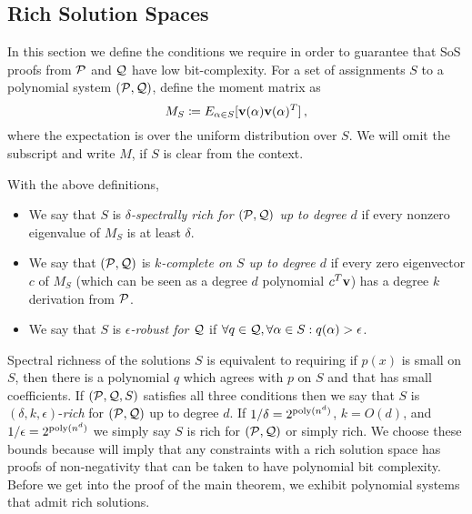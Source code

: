 \subsection{Rich Solution Spaces}
In this section we define the conditions we require in order to guarantee that SoS proofs from $\mathcal P$ and $\mathcal Q$ have low bit-complexity.
For a set of assignments $S$ to a polynomial system $(\mathcal P,\mathcal Q)$, define the moment matrix as
\[M_S \coloneqq E_{\alpha \in S}[{\bf v}(\alpha){\bf v}(\alpha)^T]\,,\]
where the expectation is over the uniform distribution over $S$.  We will omit the subscript and write $M$, if $S$ is clear from the context.

\begin{definition}\label{def:nice}
With the above definitions, 
\begin{itemize}
\item We say that $S$ is \emph{$\delta$-spectrally rich for $(\mathcal P, \mathcal Q)$ up to degree $d$} if every nonzero eigenvalue of $M_S$ is at least $\delta$.
\item We say that $(\mathcal P, \mathcal Q)$ is \emph{$k$-complete on $S$ up to degree $d$} if every zero eigenvector $c$ of $M_S$ (which can be seen as a degree $d$ polynomial $c^T{\bf v}$) has a degree $k$ derivation from $\mathcal P$. 
\item We say that $S$ is \emph{$\epsilon$-robust for $\mathcal Q$} if $\forall q \in \mathcal Q, \forall \alpha \in S: q(\alpha) > \epsilon$.
\end{itemize}
\end{definition}
Spectral richness of the solutions $S$ is equivalent to requiring if $p(x)$ is small on $S$, then there is a polynomial $q$ which agrees with $p$ on $S$ and that has small coefficients. If $(\mathcal P, \mathcal Q, S)$ satisfies all three conditions then we say that $S$ is $(\delta, k, \epsilon)$-\emph{rich} for $(\mathcal P, \mathcal Q)$ up to degree $d$. If $1/\delta = 2^{\operatorname{poly}(n^d)}$, $k = O(d)$, and $1/\epsilon = 2^{\operatorname{poly}(n^d)}$ we simply say $S$ is rich for $(\mathcal P, \mathcal Q)$ or simply rich. We choose these bounds because  will imply that any constraints with a rich solution space has proofs of non-negativity that can be taken to have polynomial bit complexity. Before we get into the proof of the main theorem, we exhibit polynomial systems that admit rich solutions.
